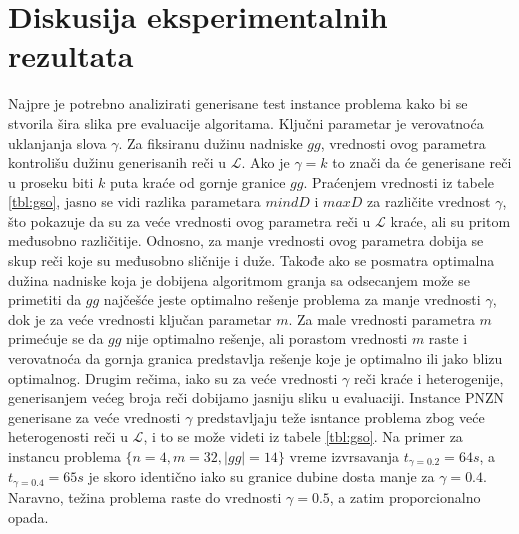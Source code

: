 \documentclass[12pt,oneside]{memoir}
\begin{document}
\section{Diskusija eksperimentalnih rezultata}
\label{chap:diskusijaRez}
Najpre je potrebno
analizirati generisane test instance problema kako bi se stvorila šira slika
pre evaluacije algoritama. Ključni parametar
je verovatnoća uklanjanja slova $\gamma$. 
Za fiksiranu dužinu nadniske $gg$, vrednosti ovog parametra
kontrolišu dužinu generisanih reči u $\mathcal{L}$.
Ako je $\gamma=k$ to znači da će generisane reči u proseku
biti $k$ puta kraće od gornje granice $gg$.
Praćenjem vrednosti iz tabele \ref{tbl:gso}, jasno se vidi
razlika parametara $mindD$ i $maxD$ za različite vrednost $\gamma$,
što pokazuje da su za veće vrednosti ovog parametra reči u $\mathcal{L}$ kraće,
ali su pritom međusobno različitije. Odnosno, za manje vrednosti
ovog parametra dobija se skup reči koje su međusobno sličnije i duže.
Takođe ako se posmatra optimalna dužina nadniske koja je dobijena algoritmom
granja sa odsecanjem
može se primetiti da $gg$ najčešće jeste 
optimalno rešenje problema za manje vrednosti $\gamma$, dok je za veće 
vrednosti ključan parametar $m$. Za male vrednosti parametra
$m$ primećuje se da $gg$ nije optimalno rešenje,
ali porastom vrednosti $m$ raste i verovatnoća da gornja granica predstavlja
rešenje koje je optimalno ili jako blizu optimalnog.
Drugim rečima, iako su za veće vrednosti $\gamma$ reči kraće i heterogenije,
generisanjem većeg broja reči dobijamo jasniju sliku u evaluaciji.
Instance PNZN generisane za veće vrednosti $\gamma$ predstavljaju
teže isntance problema zbog veće heterogenosti reči u $\mathcal{L}$, i to
se može videti iz tabele \ref{tbl:gso}. Na primer za instancu problema
$\{n=4,m=32,|gg|=14\}$ vreme izvrsavanja $t_{\gamma=0.2}=64s$, a $t_{\gamma=0.4}=65s$
je skoro identično iako su granice dubine dosta manje za $\gamma=0.4$.
Naravno, težina problema raste do vrednosti $\gamma=0.5$, a zatim proporcionalno opada.
\end{document}
